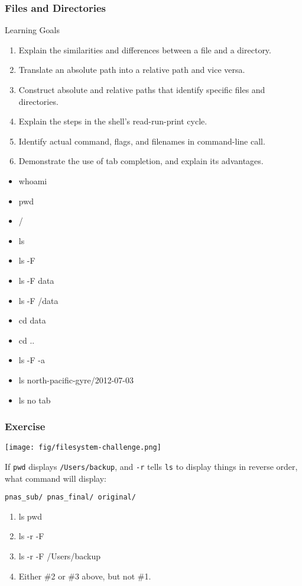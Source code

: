 \documentclass[xcolor=dvipsnames]{beamer}
\begin{document}
\begin{frame}
\frametitle{Files and Directories}
Learning Goals
{\small
\begin{enumerate}
\item    Explain the similarities and differences between a file and a directory.
\item    Translate an absolute path into a relative path and vice versa.
\item    Construct absolute and relative paths that identify specific files and directories.
\item    Explain the steps in the shell's read-run-print cycle.
\item    Identify actual command, flags, and filenames in command-line call.
\item    Demonstrate the use of tab completion, and explain its advantages.
\end{enumerate}

\begin{multicols}{2}
\begin{itemize}
\item whoami
\item pwd
\item /
\item ls
\item ls -F
\item ls -F data
\item ls -F /data
\item cd data
\item cd ..
\item ls -F -a
\item ls north-pacific-gyre/2012-07-03
\item ls no tab
\end{itemize}
\end{multicols}}
\end{frame}

\begin{frame}
\frametitle{Exercise}

\texttt{[image: fig/filesystem-challenge.png]}

If \texttt{pwd} displays \texttt{/Users/backup}, and \texttt{-r} tells \texttt{ls} to display things in reverse order, what command will display:

\texttt{pnas\_sub/ pnas\_final/ original/}
\begin{enumerate}
\item ls pwd
\item ls -r -F
\item ls -r -F /Users/backup
\item Either \#2 or \#3 above, but not \#1.
\end{enumerate}
\end{frame}
\end{document}
